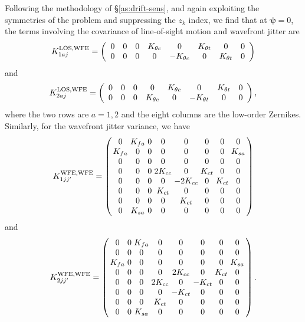 \documentclass[usenatbib]{mnras}
\begin{document}
Following the methodology of \S\ref{as:drift-sens}, and again
exploiting the symmetries of the problem and suppressing the $z_k$
index, we find that at ${\boldsymbol\psi}=0$, the terms involving the
covariance of line-of-sight motion and wavefront jitter are
\begin{equation}
K_{1aj}^{\rm LOS,WFE} = \left( \begin{array}{cccccccc}
0 & 0 & 0 & K_{\theta c} & 0 & K_{\theta t} & 0 & 0 \\
0 & 0 & 0 & 0 & -K_{\theta c} & 0 & K_{\theta t} & 0
\end{array} \right)
\label{eq:temp.078524}
\end{equation}
and
\begin{equation}
K_{2aj}^{\rm LOS,WFE} = \left( \begin{array}{cccccccc}
0 & 0 & 0 & 0 & K_{\theta c} & 0 & K_{\theta t} & 0 \\
0 & 0 & 0 & K_{\theta c} & 0 & -K_{\theta t} & 0 & 0
\end{array} \right),
\end{equation}
where the two rows are $a=1,2$ and the eight columns are the low-order
Zernikes. Similarly, for the wavefront jitter variance, we have
\begin{equation}
\setlength\arraycolsep{1.5pt}
K_{1jj'}^{\rm WFE,WFE} = \left( \begin{array}{cccccccc}
0 & K_{fa} & 0 & 0 & 0 & 0 & 0 & 0 \\
K_{fa} & 0 & 0 & 0 & 0 & 0 & 0 & K_{sa} \\
0 & 0 & 0 & 0 & 0 & 0 & 0 & 0 \\
0 & 0 & 0 & 2K_{cc} & 0 & K_{ct} & 0 & 0 \\
0 & 0 & 0 & 0 & -2K_{cc} & 0 & K_{ct} & 0 \\
0 & 0 & 0 & K_{ct} & 0 & 0 & 0 & 0 \\
0 & 0 & 0 & 0 & K_{ct} & 0 & 0 & 0 \\
0 & K_{sa} & 0 & 0 & 0 & 0 & 0 & 0 \\
\end{array} \right)
\end{equation}
and
\begin{equation}
\setlength\arraycolsep{1.5pt}
K_{2jj'}^{\rm WFE,WFE} = \left( \begin{array}{cccccccc}
0 & 0 & K_{fa} & 0 & 0 & 0 & 0 & 0 \\
0 & 0 & 0 & 0 & 0 & 0 & 0 & 0 \\
K_{fa} & 0 & 0 & 0 & 0 & 0 & 0 & K_{sa} \\
0 & 0 & 0 & 0 & 2K_{cc} & 0 & K_{ct} & 0 \\
0 & 0 & 0 & 2K_{cc} & 0 & -K_{ct} & 0 & 0 \\
0 & 0 & 0 & 0 & -K_{ct} & 0 & 0 & 0 \\
0 & 0 & 0 & K_{ct} & 0 & 0 & 0 & 0 \\
0 & 0 & K_{sa} & 0 & 0 & 0 & 0 & 0 \\
\end{array} \right).
\end{equation}
\end{document}
